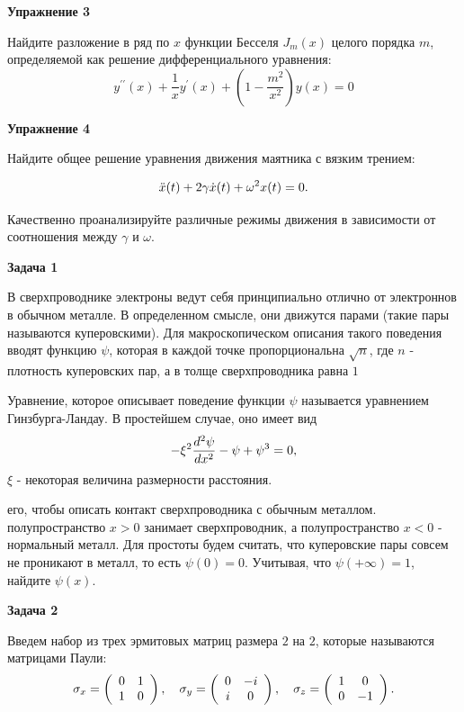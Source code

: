 \documentclass[a4paper,12pt]{article}
\begin{document}
\vspace{15pt}
\noindent \textbf{Упражнение 3}

\noindent Найдите разложение в ряд по $x$ функции Бесселя $J_{m}(x)$ целого порядка $m$, определяемой как решение дифференциального уравнения:
$$
y^{\prime\prime}(x)+\frac{1}{x}y^{\prime}(x)+\left(1-\frac{m^2}{x^2}\right)y(x)=0
$$

\vspace{15pt}
\noindent \textbf{Упражнение 4}

\noindent Найдите общее решение уравнения движения маятника с вязким трением:

\begin{equation}
\notag
\ddot{x}(t)+2\gamma \dot{x}(t) +\omega^2 x(t)=0.
\end{equation} 

\noindent Качественно проанализируйте различные режимы движения в зависимости от соотношения между $\gamma$ и $\omega$.

\vspace{15pt}
\noindent \textbf{Задача 1}

\noindent В сверхпроводнике электроны ведут себя принципиально отлично от электроннов в обычном металле. В определенном смысле, они движутся парами (такие пары называются куперовскими). Для макроскопическом описания такого поведения вводят функцию $\psi$, которая в каждой точке пропорциональна $\sqrt{n}$, где $n$ - плотность куперовских пар, а в толще сверхпроводника равна $1$

\noindent Уравнение, которое описывает поведение функции $\psi$ называется уравнением Гинзбурга-Ландау. В простейшем случае, оно имеет вид
\begin{equation}\notag
-\xi^{2}\frac{d^{2}\psi}{dx^{2}}-\psi+\psi^{3}	=0,
\end{equation}
 $\xi$ - некоторая величина размерности расстояния.

 его, чтобы описать контакт сверхпроводника с обычным металлом.  полупространство $x>0$ занимает сверхпроводник, а полупространство $x<0$ - нормальный металл. Для простоты будем считать, что куперовские пары совсем не проникают в металл, то есть $\psi(0)=0$. Учитывая, что $\psi(+\infty)=1$, найдите $\psi(x)$.

\vspace{15pt}
\noindent \textbf{Задача 2}

\noindent Введем набор из трех эрмитовых матриц размера $2$ на $2$, которые называются матрицами Паули:
\begin{equation}\notag
\sigma_{x}=\left(\begin{array}{cc}
0 & 1\\
1 & 0
\end{array}\right),\quad\sigma_{y}=\left(\begin{array}{cc}
0 & -i\\
i & 0
\end{array}\right),\quad\sigma_{z}=\left(\begin{array}{cc}
1 & 0\\
0 & -1
\end{array}\right).
\end{equation}
\end{document}

